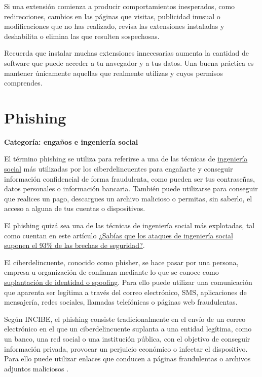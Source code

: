 \documentclass[
  spanish,
  a4paper,
  openany]{book}
\begin{document}
Si una extensión comienza a producir comportamientos inesperados, como redirecciones, cambios en las páginas que visitas, publicidad inusual o modificaciones que no has realizado, revisa las extensiones instaladas y deshabilita o elimina las que resulten sospechosas.

Recuerda que instalar muchas extensiones innecesarias aumenta la cantidad de software que puede acceder a tu navegador y a tus datos. Una buena práctica es mantener únicamente aquellas que realmente utilizas y cuyos permisos comprendes.

\section{Phishing}\label{phishing}

\textbf{Categoría: engaños e ingeniería social}

El término phishing se utiliza para referirse a una de las técnicas de \href{https://es.wikipedia.org/wiki/Ingeniería_social_(seguridad_informática)}{ingeniería social} más utilizadas por los ciberdelincuentes para engañarte y conseguir información confidencial de forma fraudulenta, como pueden ser tus contraseñas, datos personales o información bancaria. También puede utilizarse para conseguir que realices un pago, descargues un archivo malicioso o permitas, sin saberlo, el acceso a alguna de tus cuentas o dispositivos.

El phishing quizá sea una de las técnicas de ingeniería social más explotadas, tal como cuentan en este artículo \href{https://www.osi.es/es/actualidad/blog/2019/12/04/sabias-que-los-ataques-de-ingenieria-social-suponen-el-93-de-las-brechas}{¿Sabías que los ataques de ingeniería social suponen el 93\% de las brechas de seguridad?}.

El ciberdelincuente, conocido como phisher, se hace pasar por una persona, empresa u organización de confianza mediante lo que se conoce como \hyperref[suplantaciuxf3n-de-identidad-o-spoofing]{suplantación de identidad o spoofing}. Para ello puede utilizar una comunicación que aparenta ser legítima a través del correo electrónico, SMS, aplicaciones de mensajería, redes sociales, llamadas telefónicas o páginas web fraudulentas.

Según INCIBE, el phishing consiste tradicionalmente en el envío de un correo electrónico en el que un ciberdelincuente suplanta a una entidad legítima, como un banco, una red social o una institución pública, con el objetivo de conseguir información privada, provocar un perjuicio económico o infectar el dispositivo. Para ello puede utilizar enlaces que conducen a páginas fraudulentas o archivos adjuntos maliciosos \citep{INCIBE-phishing}.
\end{document}
